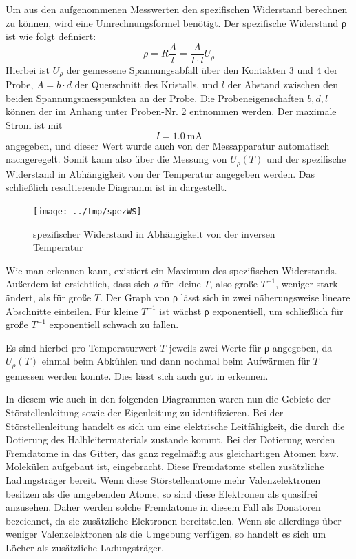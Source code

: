 Um aus den aufgenommenen Messwerten den spezifischen Widerstand berechnen zu
können, wird eine Umrechnungsformel benötigt. Der spezifische Widerstand ρ ist
wie folgt definiert:
\begin{equation}
ρ = R\frac{A}{l} = \frac{A}{I\cdot l} U_ρ
\label{eqn:rho}
\end{equation}
Hierbei ist $U_ρ$ der gemessene Spannungsabfall über den Kontakten 3 und 4 der Probe,
$A= b\cdot d$ der Querschnitt des Kristalls, und $l$ der Abstand zwischen den
beiden Spannungsmesspunkten an der Probe. Die Probeneigenschaften $b, d, l$ können
der  im Anhang unter Proben-Nr. 2 entnommen werden.
Der maximale Strom ist mit
\begin{equation}
 I = \SI{1,0}{\milli\ampere} 
\end{equation}
angegeben, und dieser Wert wurde auch von der Messapparatur automatisch nachgeregelt.
Somit kann also über die Messung von $U_ρ(T)$ und  der spezifische Widerstand in
Abhängigkeit von der Temperatur angegeben werden. Das schließlich resultierende
Diagramm ist in  dargestellt.

\begin{figure}[htb]
   \centering
   \texttt{[image: ../tmp/spezWS]}
   \caption{spezifischer Widerstand in Abhängigkeit von der inversen Temperatur}
   \label{fig:spezWS}
\end{figure}

Wie man erkennen kann, existiert ein Maximum des spezifischen Widerstands.
Außerdem ist ersichtlich, dass sich $ρ$ für kleine $T$, also große $T^{-1}$,
weniger stark ändert, als für große $T$.
Der Graph von ρ lässt sich in zwei
näherungsweise lineare Abschnitte einteilen. Für kleine $T^{-1}$ ist wächst ρ
exponentiell, um schließlich für große $T^{-1}$ exponentiell schwach zu fallen.

Es sind hierbei pro Temperaturwert $T$ jeweils zwei Werte für ρ angegeben, da $U_ρ(T)$
einmal beim Abkühlen und dann nochmal beim Aufwärmen für $T$ gemessen werden konnte.
Dies lässt sich auch gut in  erkennen.

In diesem wie auch in den folgenden Diagrammen waren nun die Gebiete der
Störstellenleitung sowie der Eigenleitung zu identifizieren. Bei der
Störstellenleitung handelt es sich um eine elektrische Leitfähigkeit, die durch
die Dotierung des Halbleitermaterials zustande kommt. Bei der Dotierung werden
Fremdatome in das Gitter, das ganz regelmäßig aus gleichartigen Atomen bzw.
Molekülen aufgebaut ist, eingebracht. Diese Fremdatome stellen zusätzliche
Ladungsträger bereit. Wenn diese Störstellenatome mehr Valenzelektronen besitzen
als die umgebenden Atome, so sind diese Elektronen als quasifrei anzusehen.
Daher werden solche Fremdatome in diesem Fall als Donatoren bezeichnet, da sie
zusätzliche Elektronen bereitstellen. Wenn sie allerdings über weniger
Valenzelektronen als die Umgebung verfügen, so handelt es sich um Löcher als
zusätzliche Ladungsträger.

